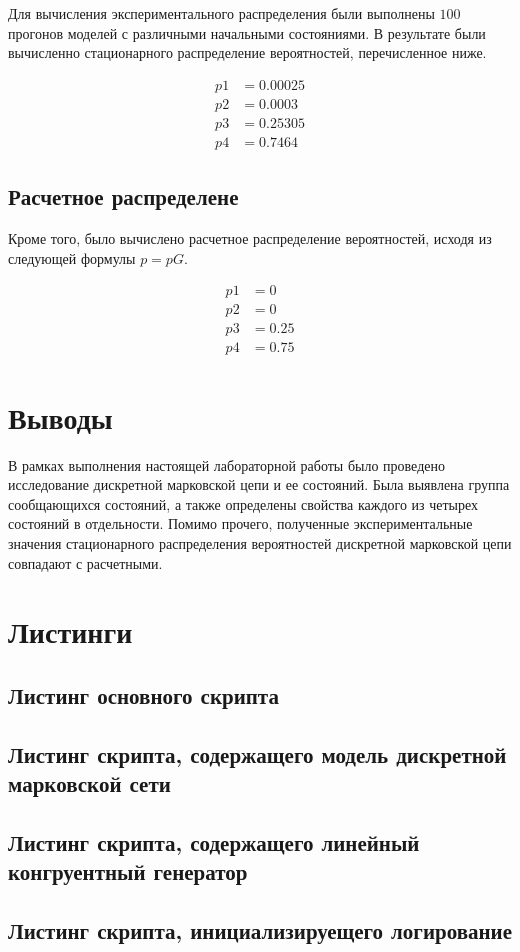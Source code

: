 Для вычисления экспериментального распределения были выполнены $100$ прогонов моделей с различными начальными состояниями.
В результате были вычисленно стационарного распределение вероятностей, перечисленное ниже.

\begin{align*}
    p1 & = 0.00025\\
    p2 & = 0.0003\\
    p3 & = 0.25305\\
    p4 & = 0.7464
\end{align*}

\subsection*{Расчетное распределене}

Кроме того, было вычислено расчетное распределение вероятностей, исходя из следующей формулы $p=pG$.

\begin{align*}
    p1 & = 0\\
    p2 & = 0\\
    p3 & = 0.25\\
    p4 & = 0.75
\end{align*}

\section*{Выводы}

В рамках выполнения настоящей лабораторной работы было проведено исследование дискретной марковской цепи и ее состояний.
Была выявлена группа сообщающихся состояний, а также определены свойства каждого из четырех состояний в отдельности.
Помимо прочего, полученные экспериментальные значения стационарного распределения вероятностей дискретной марковской цепи совпадают с
расчетными.

\section*{Листинги}

\subsection*{Листинг основного скрипта}


\subsection*{Листинг скрипта, содержащего модель дискретной марковской сети}


\subsection*{Листинг скрипта, содержащего линейный конгруентный генератор}


\subsection*{Листинг скрипта, инициализируещего логирование}

